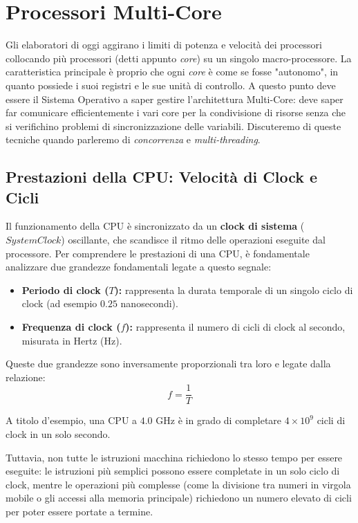 \documentclass[12pt]{report}
\begin{document}
	\section{Processori Multi-Core}
	Gli elaboratori di oggi aggirano i limiti di potenza e velocità dei processori collocando più processori (detti appunto \textit{core}) su un singolo macro-processore.
	La caratteristica principale è proprio che ogni \textit{core} è come se fosse "autonomo", in quanto possiede i suoi registri e le sue unità di controllo.
	A questo punto deve essere il Sistema Operativo a saper gestire l'architettura Multi-Core: deve saper far comunicare efficientemente i vari core per la condivisione di risorse senza che si verifichino problemi di sincronizzazione delle variabili.
	Discuteremo di queste tecniche quando parleremo di \textit{concorrenza} e \textit{multi-threading}.
	
	\subsection{Prestazioni della CPU: Velocità di Clock e Cicli}
	
	Il funzionamento della CPU è sincronizzato da un \textbf{clock di sistema} ($System Clock$) oscillante, che scandisce il ritmo delle operazioni eseguite dal processore. Per comprendere le prestazioni di una CPU, è fondamentale analizzare due grandezze fondamentali legate a questo segnale:
	
	\begin{itemize}
		
		\item \textbf{Periodo di clock ($T$):} rappresenta la durata temporale di un singolo ciclo di clock (ad esempio $0.25$ nanosecondi).
		
		\item \textbf{Frequenza di clock ($f$):} rappresenta il numero di cicli di clock al secondo, misurata in Hertz ($\text{Hz}$).
		
	\end{itemize}
	
	Queste due grandezze sono inversamente proporzionali tra loro e legate dalla relazione:
	\[
	f = \frac{1}{T}
	\]
	
	A titolo d'esempio, una CPU a $4.0\text{ GHz}$ è in grado di completare $4 \times 10^9$ cicli di clock in un solo secondo.
	
	Tuttavia, non tutte le istruzioni macchina richiedono lo stesso tempo per essere eseguite: le istruzioni più semplici possono essere completate in un solo ciclo di clock, mentre le operazioni più complesse (come la divisione tra numeri in virgola mobile o gli accessi alla memoria principale) richiedono un numero elevato di cicli per poter essere portate a termine.
	
\end{document}
